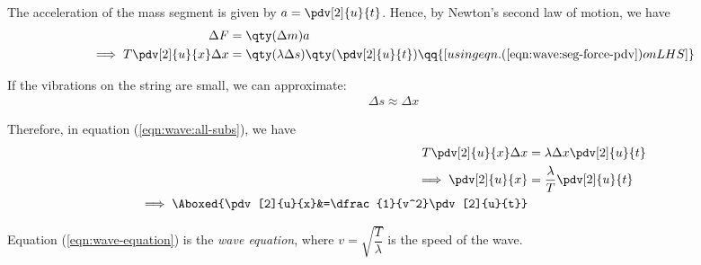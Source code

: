     The acceleration of the mass segment is given by $a=\pdv[2]{u}{t}$. Hence, by Newton's second law of motion, we have
    \begin{align}
        \Delta F&=\qty(\Delta m) a \nonumber\\
        \implies T\pdv[2]{u}{x}\Delta x&=\qty(\lambda\Delta s)\qty(\pdv[2]{u}{t})\qq{[using eqn. (\ref{eqn:wave:seg-force-pdv}) on LHS]} \label{eqn:wave:all-subs}
    \end{align}

    If the vibrations on the string are small, we can approximate:
    \begin{align*}
        \Delta s\approx\Delta x
    \end{align*}

    Therefore, in equation (\ref{eqn:wave:all-subs}), we have
    \begin{align}
        T\pdv[2]{u}{x}\Delta x&=\lambda\Delta x\pdv[2]{u}{t} \nonumber\\
        \implies\pdv[2]{u}{x}&=\dfrac{\lambda}{T}\pdv[2]{u}{t} \nonumber\\
        \implies\Aboxed{\pdv[2]{u}{x}&=\dfrac{1}{v^2}\pdv[2]{u}{t}} \label{eqn:wave-equation}
    \end{align}

    Equation (\ref{eqn:wave-equation}) is the \textit{wave equation}, where $v=\sqrt{\dfrac{T}{\lambda}}$ is the speed of the wave.